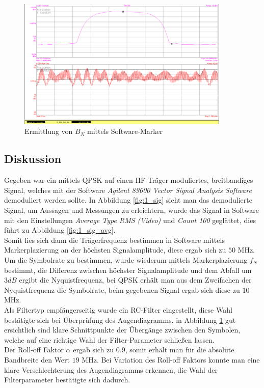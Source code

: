 \documentclass[12pt,a4paper,ngerman]{article}
\begin{document}
\pagebreak

\begin{figure}[H]
\centering
\includegraphics[width=0.9\textwidth]{figures/Aufgabe1_QPSK_B.jpg} 
\caption{Ermittlung von $B_N$ mittels Software-Marker}
\label{fig:1_bn}
\end{figure}



\subsection{Diskussion}
Gegeben war ein mittels QPSK auf einen HF-Träger moduliertes, breitbandiges Signal, welches mit der Software \textit{Agilent 89600 Vector Signal Analysis Software} demoduliert werden sollte. In Abbildung \ref{fig:1_sig} sieht man das demodulierte Signal, um Aussagen und Messungen zu erleichtern, wurde das Signal in Software mit den Einstellungen \textit{Average Type RMS (Video)} und \textit{Count 100}\cite{skript} geglättet, dies führt zu Abbildung \ref{fig:1_sig_avg}. \\
Somit lies sich dann die Trägerfrequenz bestimmen in Software mittels Markerplazierung an der höchsten Signalamplitude, diese ergab sich zu $50$ MHz.\\ Um die Symbolrate zu bestimmen, wurde wiederum mittels Markerplazierung $f_N$ bestimmt, die Differenz zwischen höchster Signalamplitude und dem Abfall um $3dB$ ergibt die Nyquistfrequenz, bei QPSK erhält man aus dem Zweifachen der Nyquistfrequenz die Symbolrate, beim gegebenen Signal ergab sich diese zu $10$ MHz. \\
Als Filtertyp empfängerseitig wurde ein RC-Filter eingestellt, diese Wahl bestätigte sich bei Überprüfung des Augendiagramms, in Abbildung \ref{fig:1_bn} gut ersichtlich sind klare Schnittpunkte der Übergänge zwischen den Symbolen, welche auf eine richtige Wahl der Filter-Parameter schließen lassen. \\ 
Der Roll-off Faktor $\alpha$ ergab sich zu $0.9$, somit erhält man für die absolute Bandbreite den Wert $19$ MHz. Bei Variation des Roll-off Faktors konnte man eine klare Verschlechterung des Augendiagramms erkennen, die Wahl der Filterparameter bestätigte sich dadurch.
\end{document}
